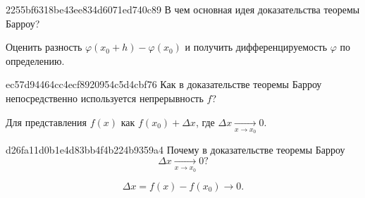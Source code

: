 
\begin{note}{2255bf6318be43ee834d6071ed740c89}
    В чем основная идея доказательства теоремы Барроу?

    \begin{cloze}{1}
        Оценить разность \({ \varphi(x_0 + h) - \varphi(x_0) }\) и получить дифференцируемость \({ \varphi }\) по определению.
    \end{cloze}
\end{note}

\begin{note}{ec57d94464cc4ecf8920954c5d4cbf76}
    Как в доказательстве теоремы Барроу непосредственно используется непрерывность \({ f }\)?

    \begin{cloze}{1}
        Для представления \({ f(x) }\) как \({ f(x_0) + \Delta x }\), где \({ \Delta x \underset{x \to x_0}\longrightarrow 0 }\).
    \end{cloze}
\end{note}

\begin{note}{d26fa11d0b1e4d83bb4f4b224b9359a4}
    Почему в доказательстве теоремы Барроу
    \[
        \Delta  x \underset{x \to x_0}\longrightarrow 0?
    \]

    \begin{cloze}{1}
        \[
            \Delta x = f(x) - f(x_0) \to 0.
        \]
    \end{cloze}
\end{note}

